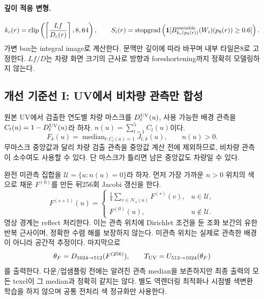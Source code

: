 \documentclass[11pt,a4paper]{article}
\newcommand{\ind}{\mathbf{1}}
\newcommand{\sg}{\operatorname{stopgrad}}
\newcommand{\med}{\operatorname{median}}
\begin{document}
\paragraph{깊이 적응 변형.}
\begin{equation}
 k_c(r)=\operatorname{clip}\left(\left\lceil\frac{Lf}{D_c(r)}\right\rceil,8,64\right),\qquad
 S_i(r)=\sg\left(\ind[B_{k_c(p_8(r))}^{\rm variable}(W_i)(p_8(r))\ge0.6]\right).
\end{equation}
가변 box는 integral image로 계산한다. 문맥만 깊이에 따라 바꾸며 내부 타일은8로 고정한다. $Lf/D$는 차량 화면 크기의 근사로 방향과 foreshortening까지 정확히 모델링하지 않는다.

\subsection{개선 기준선 I: UV에서 비차량 관측만 합성}
원본 UV에서 검출한 연도별 차량 마스크를 $D_t^{\rm UV}(u)$, 사용 가능한 배경 관측을 $C_t(u)=1-D_t^{\rm UV}(u)$라 하자. $n(u)=\sum_{t=1}^5C_t(u)$이다.
\begin{equation}
 F_k(u)=\med_{t:C_t(u)=1}J_{t,k}(u),\qquad n(u)>0.\label{eq:fusion}
\end{equation}
무마스크 중앙값과 달리 차량 검출 관측을 중앙값 계산 전에 제외하므로, 비차량 관측이 소수여도 사용할 수 있다. 단 마스크가 틀리면 남은 중앙값도 차량일 수 있다.

완전 미관측 집합을 $\mathcal U=\{u:n(u)=0\}$라 하자. 먼저 가장 가까운 $n>0$ 위치의 색으로 채운 $F^{(0)}$를 만든 뒤256회 Jacobi 갱신을 한다.
\begin{equation}
 F^{(s+1)}(u)=
 \begin{cases}
 \frac14\sum_{v\in\mathcal N_4(u)}F^{(s)}(v),&u\in\mathcal U,\\
 F^{(0)}(u),&u\notin\mathcal U.
 \end{cases}\label{eq:harmonic}
\end{equation}
영상 경계는 reflect 처리한다. 이는 관측 위치에 Dirichlet 조건을 둔 조화 보간의 유한 반복 근사이며, 정확한 수렴 해를 보장하지 않는다. 미관측 위치는 실제로 관측한 배경이 아니라 공간적 추정이다. 마지막으로
\begin{equation}
 \theta_F=D_{1024\to512}(F^{(256)}),\qquad T_{\rm UV}=U_{512\to1024}(\theta_F)
\end{equation}
를 출력한다. 다운/업샘플링 전에는 알려진 관측 median을 보존하지만 최종 출력의 모든 texel이 그 median과 정확히 같지는 않다. 별도 역렌더링 최적화나 시점별 색변환 학습을 하지 않으며 공통 전처리 색 정규화만 사용한다.
\end{document}
